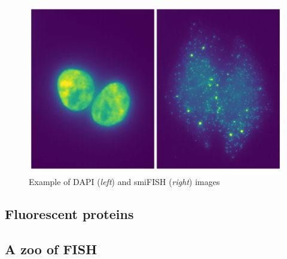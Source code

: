 
\begin{figure}[]
    \centering
    \includegraphics[width=\textwidth]{figures/introduction/multichannel_input}
    \caption[Example of DAPI and smiFISH images]{Example of DAPI (\textit{left}) and smiFISH (\textit{right}) images}
    \label{fig:multichannel_input}
\end{figure}

\subsection{Fluorescent proteins}
\label{subsec:intro_fluorescence}

\subsection{A zoo of FISH}
\label{subsec:intro_fish}





